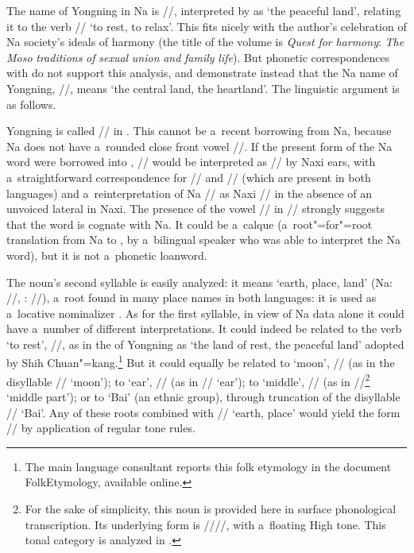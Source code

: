 The name of Yongning in Na is //, interpreted by \citet[23]{shih2010} as ‘the peaceful land’, relating it to the verb // ‘to rest, to relax'. This  fits nicely with the author’s celebration of Na society's ideals of harmony (the title of the volume is \textit{Quest} \textit{for} \textit{harmony}:
\textit{The} \textit{Moso} \textit{traditions} \textit{of} \textit{sexual} \textit{union}
\textit{and} \textit{family} \textit{life}). But phonetic correspondences with  do not support this analysis, and demonstrate instead that the Na name of Yongning, //, means ‘the central land, the heartland’. The linguistic argument is as follows.

Yongning is called // in  \citep[201]{heetal2011}. This cannot be a~recent borrowing from Na, because Na does not have a~rounded close front vowel //. If the present form of the Na word were borrowed into , // would be interpreted as // by Naxi ears, with a~straightforward correspondence for // and // (which are present in both languages) and a~reinterpretation of Na // as Naxi // in the absence of an unvoiced lateral in Naxi. The presence of the vowel // in  // strongly suggests that the word is cognate with Na. It could be a~calque (a~root"=for"=root translation from Na to , by a~bilingual speaker who was able to interpret the Na word), but it is not a~phonetic loanword.

The noun's second syllable is easily analyzed: it means ‘earth, place, land' (Na: //, : //), a~root found in many place names in both languages: it is used as a~locative nominalizer \citep[559]{lidz2010}. As for the first syllable, in view of Na data alone it could have a~number of different interpretations. It could indeed be related to the verb ‘to rest', //, as in the  of Yongning as ‘the land of rest, the peaceful land’ adopted by Shih Chuan"=kang.\footnote{The main language consultant reports this {folk etymology} in the document FolkEtymology, available online.
} 
	 But it could equally be related to ‘moon', // (as in the disyllable // ‘moon'); to ‘ear', // (as in // ‘ear'); to ‘middle', // (as in //\footnote{For the sake of simplicity, this noun is provided here in surface phonological transcription. Its underlying form is ////, with a~{floating} High tone. This tonal category is analyzed in .} ‘middle part'); or to ‘Bai' (an ethnic group), through truncation of the disyllable // ‘Bai'. Any of these roots combined with  // ‘earth, place' would yield the form // by application of regular tone rules. 

